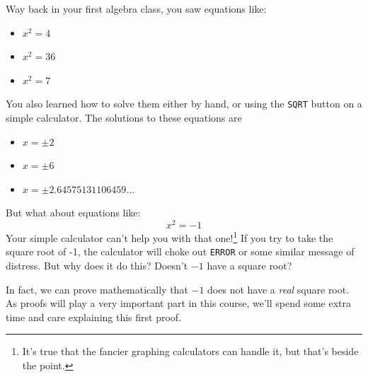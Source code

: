 Way back in your first algebra class, you saw equations like:
\begin{itemize}
\item $x^2 = 4$
\item $x^2 = 36$
\item $x^2 = 7$

\end{itemize}
You also learned how to solve them either by hand, or using the \texttt{SQRT} button on a simple calculator. The solutions to these equations are
\begin{itemize}
\item $x = \pm 2$
\item $x = \pm 6$
\item $x = \pm 2.64575131106459\ldots$
\end{itemize}
 But what about equations like:
\[x^2 = -1 \]
Your simple calculator can't help you with that one!\footnote{It's true that the fancier graphing calculators can handle it, but that's beside the point.}  If you try to take the square root of -1, the calculator will choke out \texttt{ERROR} or some similar message of distress.  But why does it do this? Doesn't $-1$ have a square root? 

In fact, we can prove mathematically that $-1$ does not have a \emph{real} square root. As proofs will play a very important part in this course, we'll spend some extra time and care explaining this first proof.

